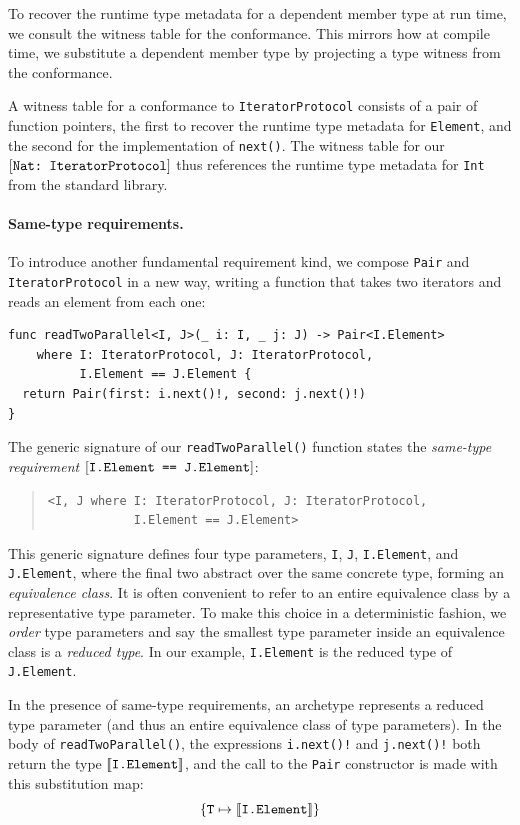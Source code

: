 \documentclass[../generics]{subfiles}
\begin{document}
To recover the runtime type metadata for a dependent member type at run time, we consult the witness table for the conformance. This mirrors how at compile time, we substitute a dependent member type by projecting a type witness from the conformance.

A witness table for a conformance to \texttt{IteratorProtocol} consists of a pair of function pointers, the first to recover the runtime type metadata for \texttt{Element}, and the second for the implementation of \texttt{next()}. The witness table for our $[\texttt{Nat:~IteratorProtocol}]$ thus references the runtime type metadata for \texttt{Int} from the standard library.

\paragraph{Same-type requirements.} To introduce another fundamental requirement kind, we compose \texttt{Pair} and \texttt{IteratorProtocol} in a new way, writing a function that takes two iterators and reads an element from each one:
\begin{Verbatim}
func readTwoParallel<I, J>(_ i: I, _ j: J) -> Pair<I.Element>
    where I: IteratorProtocol, J: IteratorProtocol,
          I.Element == J.Element {
  return Pair(first: i.next()!, second: j.next()!)
}
\end{Verbatim}
The generic signature of our \verb|readTwoParallel()| function states the \emph{same-type requirement} $[\texttt{I.Element == J.Element}]$:
\begin{quote}
\begin{verbatim}
<I, J where I: IteratorProtocol, J: IteratorProtocol,
            I.Element == J.Element>
\end{verbatim}
\end{quote}
This generic signature defines four type parameters, \texttt{I}, \texttt{J}, \texttt{I.Element}, and \texttt{J.Element}, where the final two abstract over the same concrete type, forming an \emph{equivalence class}. It is often convenient to refer to an entire equivalence class by a representative type parameter. To make this choice in a deterministic fashion, we \emph{order} type parameters and say the smallest type parameter inside an equivalence class is a \emph{reduced type}. In our example, \texttt{I.Element} is the reduced type of \texttt{J.Element}.

In the presence of same-type requirements, an archetype represents a reduced type parameter (and thus an entire equivalence class of type parameters). In the body of \verb|readTwoParallel()|, the expressions \verb|i.next()!| and \verb|j.next()!| both return the type $[\![\texttt{I.Element}]\!]$, and the call to the \texttt{Pair} constructor is made with this substitution map:
\[\{\texttt{T} \mapsto \texttt{$[\![\texttt{I.Element}]\!]$}\}\]
\end{document}
